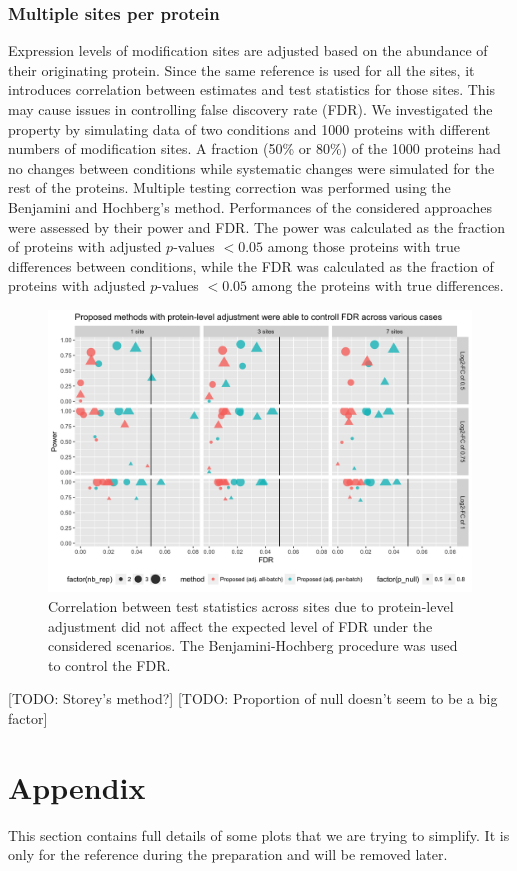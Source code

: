 \documentclass{mcp}
\def\todo#1{{\color{red}[TODO: #1]}}
\begin{document}
\subsubsection{Multiple sites per protein}

Expression levels of modification sites are adjusted based on the abundance of their originating protein. Since the same reference is used for all the sites, it introduces correlation between estimates and test statistics for those sites. This may cause issues in controlling false discovery rate (FDR). We investigated the property by simulating data of two conditions and 1000 proteins with different numbers of modification sites. A fraction (50\% or 80\%) of the 1000 proteins had no changes between conditions while systematic changes were simulated for the rest of the proteins. Multiple testing correction was performed using the Benjamini and Hochberg's method. Performances of the considered approaches were assessed by their power and FDR. The power was calculated as the fraction of proteins with adjusted $p$-values $<0.05$ among those proteins with true differences between conditions, while the FDR was calculated as the fraction of proteins with adjusted $p$-values $<0.05$ among the proteins with true differences. 

 
\begin{figure}[h!]
\centering
\includegraphics[width=.85\textwidth]{sim/prot_fdr}
\caption{Correlation between test statistics across sites due to protein-level adjustment did not affect the expected level of FDR under the considered scenarios. The Benjamini-Hochberg procedure was used to control the FDR. \label{fig:prot_fdr}}
\end{figure}

\todo{Storey's method?}
\todo{Proportion of null doesn't seem to be a big factor}


\clearpage
\section{Appendix}

This section contains full details of some plots that we are trying to simplify. It is only for the reference during the preparation and will be removed later. 
\end{document}
